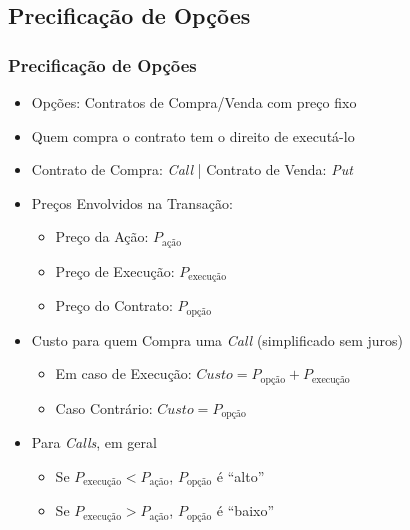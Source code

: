 \documentclass{beamer}
\begin{document}
\begin{frame}

\section{Precificação de Opções}
\frametitle{Precificação de Opções}
	
\begin{itemize}
	\item Opções: Contratos de Compra/Venda com preço fixo
	\item Quem compra o contrato tem o direito de executá-lo
	\item Contrato de Compra: \textit{Call} | Contrato de Venda: \textit{Put}
	\item Preços Envolvidos na Transação:
	\begin{itemize}
		\item Preço da Ação: $P_{\textrm{ação}}$
		\item Preço de Execução: $P_{\textrm{execução}}$
		\item Preço do Contrato: $P_{\textrm{opção}}$
	\end{itemize}
	\item Custo para quem Compra uma \textit{Call} (simplificado sem juros)
	\begin{itemize}
		\item Em caso de Execução: $Custo = P_{\textrm{opção}} + P_{\textrm{execução}}$
		\item Caso Contrário: $Custo = P_{\textrm{opção}}$
	\end{itemize}
	\item Para \textit{Calls}, em geral
	\begin{itemize}
		\item Se $P_{\textrm{execução}} < P_{\textrm{ação}}$, $P_{\textrm{opção}}$ é ``alto''
		\item Se $P_{\textrm{execução}} > P_{\textrm{ação}}$, $P_{\textrm{opção}}$ é ``baixo''
	\end{itemize}
\end{itemize}
	
\end{frame}

\end{document}
